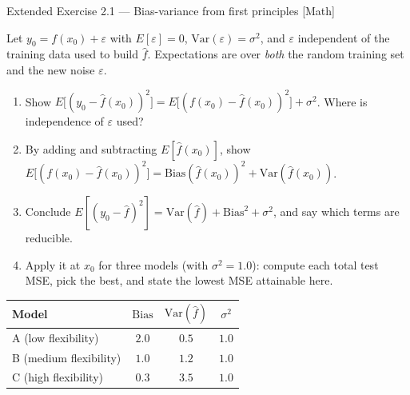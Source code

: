 \documentclass[aspectratio=169,11pt]{beamer}
\begin{document}
\begin{frame}{Extended Exercise 2.1 --- Bias-variance from first principles [Math]}
\begin{longexercise}
Let $y_0=f(x_0)+\varepsilon$ with $E[\varepsilon]=0$, $\mathrm{Var}(\varepsilon)=\sigma^2$, and $\varepsilon$ independent of the training data used to build $\hat f$. Expectations are over \emph{both} the random training set and the new noise $\varepsilon$.
\begin{enumerate}\setlength\itemsep{1pt}
  \item Show $E\big[(y_0-\hat f(x_0))^2\big]=E\big[(f(x_0)-\hat f(x_0))^2\big]+\sigma^2$. Where is independence of $\varepsilon$ used?
  \item By adding and subtracting $E[\hat f(x_0)]$, show $E\big[(f(x_0)-\hat f(x_0))^2\big]=\mathrm{Bias}(\hat f(x_0))^2+\mathrm{Var}(\hat f(x_0))$.
  \item Conclude $E[(y_0-\hat f)^2]=\mathrm{Var}(\hat f)+\mathrm{Bias}^2+\sigma^2$, and say which terms are reducible.
  \item Apply it at $x_0$ for three models (with $\sigma^2=1.0$): compute each total test MSE, pick the best, and state the lowest MSE attainable here.
\end{enumerate}
\vspace{-1mm}
\begin{center}\footnotesize
\begin{tabular}{lccc}
\toprule
Model & $\mathrm{Bias}$ & $\mathrm{Var}(\hat f)$ & $\sigma^2$ \\
\midrule
A (low flexibility)    & $2.0$ & $0.5$ & $1.0$ \\
B (medium flexibility) & $1.0$ & $1.2$ & $1.0$ \\
C (high flexibility)   & $0.3$ & $3.5$ & $1.0$ \\
\bottomrule
\end{tabular}
\end{center}
\end{longexercise}
\end{frame}
\end{document}
